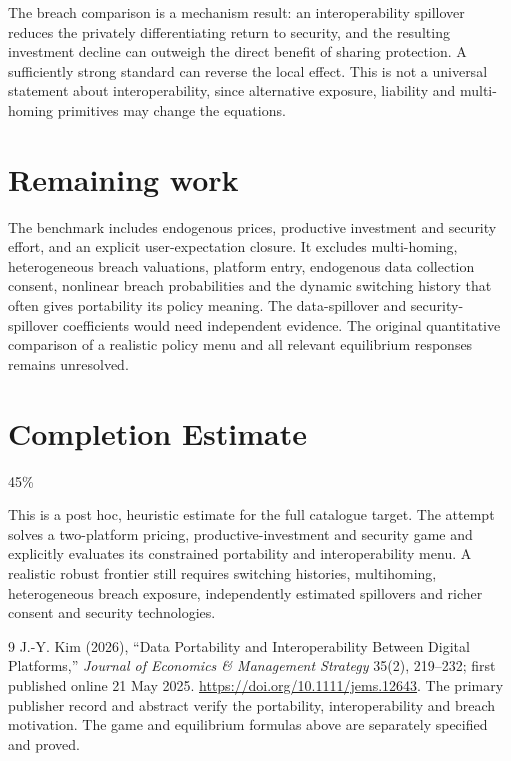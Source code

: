 \documentclass[11pt,a4paper]{article}
\theoremstyle{definition}
\theoremstyle{remark}
\begin{document}
The breach comparison is a mechanism result: an interoperability spillover reduces the privately differentiating return to security, and the resulting investment decline can outweigh the direct benefit of sharing protection. A sufficiently strong standard can reverse the local effect. This is not a universal statement about interoperability, since alternative exposure, liability and multi-homing primitives may change the equations.

\section{Remaining work}
The benchmark includes endogenous prices, productive investment and security effort, and an explicit user-expectation closure. It excludes multi-homing, heterogeneous breach valuations, platform entry, endogenous data collection consent, nonlinear breach probabilities and the dynamic switching history that often gives portability its policy meaning. The data-spillover and security-spillover coefficients would need independent evidence. The original quantitative comparison of a realistic policy menu and all relevant equilibrium responses remains unresolved.

\section{Completion Estimate}
45\%

This is a post hoc, heuristic estimate for the full catalogue target.
The attempt solves a two-platform pricing, productive-investment and security game and explicitly evaluates its constrained portability and interoperability menu. A realistic robust frontier still requires switching histories, multihoming, heterogeneous breach exposure, independently estimated spillovers and richer consent and security technologies.

\begin{thebibliography}{9}
 J.-Y. Kim (2026), ``Data Portability and Interoperability Between Digital Platforms,'' \emph{Journal of Economics \& Management Strategy} 35(2), 219--232; first published online 21 May 2025. \url{https://doi.org/10.1111/jems.12643}. The primary publisher record and abstract verify the portability, interoperability and breach motivation. The game and equilibrium formulas above are separately specified and proved.
\end{thebibliography}
\end{document}
